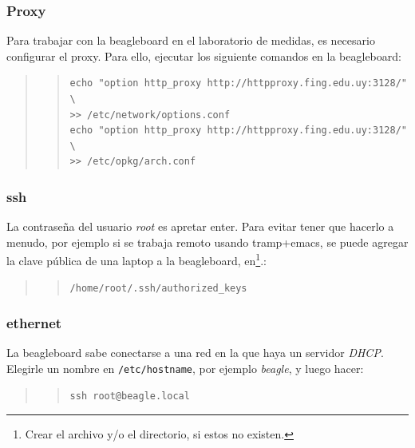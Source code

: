 \documentclass[main]{subfiles}
\begin{document}
\subsubsection{Proxy}
\label{sec:codigo:proxy}

Para trabajar con la beagleboard en el laboratorio de medidas, es necesario configurar el proxy. Para ello, ejecutar los siguiente comandos en la beagleboard:
\begin{quote}
\begin{quote}
\begin{verbatim}
echo "option http_proxy http://httpproxy.fing.edu.uy:3128/" \
>> /etc/network/options.conf
echo "option http_proxy http://httpproxy.fing.edu.uy:3128/" \
>> /etc/opkg/arch.conf
\end{verbatim}
\end{quote}
\end{quote}

\subsubsection{ssh}
\label{sec:codigo:ssh}

La contraseña del usuario \textit{root} es apretar enter. Para evitar tener que hacerlo a menudo, por ejemplo si se trabaja remoto usando tramp+emacs, se puede agregar la clave pública de una laptop a la beagleboard, en\footnote{Crear el archivo y/o el directorio, si estos no existen.}.:
\begin{quote}
\begin{quote}
\begin{verbatim}
/home/root/.ssh/authorized_keys
\end{verbatim}
\end{quote}
\end{quote}

\subsubsection{ethernet}
\label{sec:codigo:ethernet}

La beagleboard sabe conectarse a una red en la que haya un servidor \textit{DHCP}. Elegirle un nombre en \verb+/etc/hostname+, por ejemplo \textit{beagle}, y luego hacer:
\begin{quote}
\begin{quote}
\begin{verbatim}
ssh root@beagle.local
\end{verbatim}
\end{quote}
\end{quote}
\end{document}
